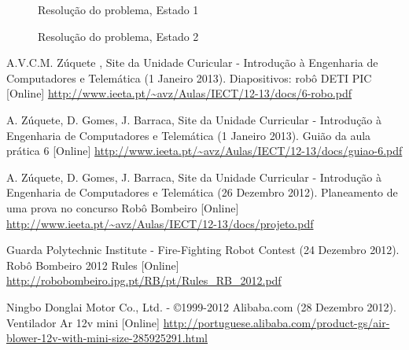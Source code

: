 \documentclass[pdftex,12pt,a4paper]{report}
\begin{document}
\begin{figure}[h]
\centerline{}
\caption{Resolução do problema, Estado 1}\label{estado1}
\end{figure}

\begin{figure}[h]
\centerline{}
\caption{Resolução do problema, Estado 2}\label{estado2}
\end{figure}

\renewcommand{\bibname}{Referências}

\begin{thebibliography}{99}

A.V.C.M. Zúquete , Site da Unidade Curicular - Introdução à Engenharia de Computadores e Telemática (1 Janeiro 2013).
\newblock Diapositivos: robô DETI PIC [Online]
 \url{http://www.ieeta.pt/~avz/Aulas/IECT/12-13/docs/6-robo.pdf}

A. Zúquete, D. Gomes, J. Barraca, Site da Unidade Curricular - Introdução à Engenharia de Computadores e Telemática (1 Janeiro 2013).
\newblock Guião da aula prática 6 [Online]
 \url{http://www.ieeta.pt/~avz/Aulas/IECT/12-13/docs/guiao-6.pdf}

A. Zúquete, D. Gomes, J. Barraca, Site da Unidade Curricular - Introdução à Engenharia de Computadores e Telemática (26 Dezembro 2012).
\newblock Planeamento de uma prova no concurso Robô Bombeiro [Online]
 \url{http://www.ieeta.pt/~avz/Aulas/IECT/12-13/docs/projeto.pdf}

Guarda Polytechnic Institute - Fire-Fighting Robot Contest (24 Dezembro 2012).
\newblock Robô Bombeiro 2012 Rules [Online]
 \url{http://robobombeiro.ipg.pt/RB/pt/Rules_RB_2012.pdf}

Ningbo Donglai Motor Co., Ltd. - ©1999-2012 Alibaba.com (28 Dezembro 2012).
\newblock Ventilador Ar 12v mini [Online]
 \url{http://portuguese.alibaba.com/product-gs/air-blower-12v-with-mini-size-285925291.html}

\end{thebibliography}
\end{document}
